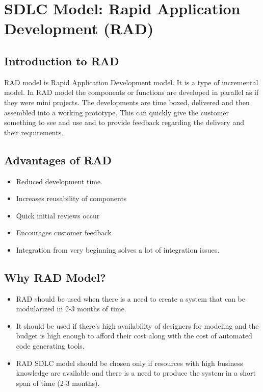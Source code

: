 \section{SDLC Model: Rapid Application Development (RAD)}
\subsection{Introduction to RAD}
RAD model is Rapid Application Development model. It is a type of incremental model. In RAD model the components or functions are developed in parallel as if they were mini projects. The developments are time boxed, delivered and then assembled into a working prototype.  This can quickly give the customer something to see and use and to provide feedback regarding the delivery and their requirements.

\subsection{Advantages of RAD}
\begin{itemize}
	\item Reduced development time.
	\item Increases reusability of components
	\item Quick initial reviews occur
	\item Encourages customer feedback
	\item Integration from very beginning solves a lot of integration issues.
	
\end{itemize}

\subsection{Why RAD Model?}
\begin{itemize}
	\item RAD should be used when there is a need to create a system that can be modularized in 2-3 months of time.
	
	\item It should be used if there’s high availability of designers for modeling and the budget is high enough to afford their cost along with the cost of automated code generating tools.
	
	\item RAD SDLC model should be chosen only if resources with high business knowledge are available and there is a need to produce the system in a short span of time (2-3 months).
\end{itemize}


